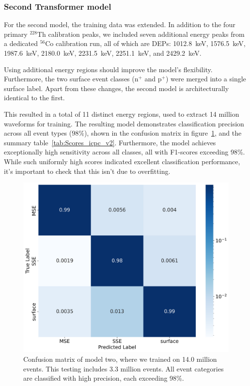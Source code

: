 \subsubsection{Second Transformer model} 

For the second model, the training data was extended. In addition to the four primary $^{228}$Th calibration peaks, we included seven additional energy peaks from a dedicated $^{56}$Co calibration run, all of which are DEPs: 1012.8~keV, 1576.5~keV, 1987.6~keV, 2180.0~keV, 2231.5~keV, 2251.1~keV, and 2429.2~keV. 

Using additional energy regions should improve the model's flexibility.
Furthermore, the two surface event classes (n$^+$ and p$^+$) were merged into a single surface label. Apart from these changes, the second model is architecturally identical to the first.

This resulted in a total of 11 distinct energy regions, used to extract 14 million waveforms for training. The resulting model demonstrates classification precision across all event types ($98\%$), shown in the confusion matrix in figure~\ref{fig:Confusionmatrix_icpc_v2}, and the summary table~\ref{tab:Scores_icpc_v2}. Furthermore, the model achieves exceptionally high sensitivity across all classes, all with F1-scores exceeding 98\%. While such uniformly high scores indicated excellent classification performance, it's important to check that this isn't due to overfitting. 

\begin{figure}[t]
    \centering
    \includegraphics[width=0.75\linewidth]{figures/05_PSD/Results_confusionmatrix_icpc_v2.png}
    \caption{Confusion matrix of model two, where we trained on 14.0 million events. This testing includes 3.3 million events. All event categories are classified with high precision, each exceeding 98\%.} 
\label{fig:Confusionmatrix_icpc_v2}
\end{figure}


